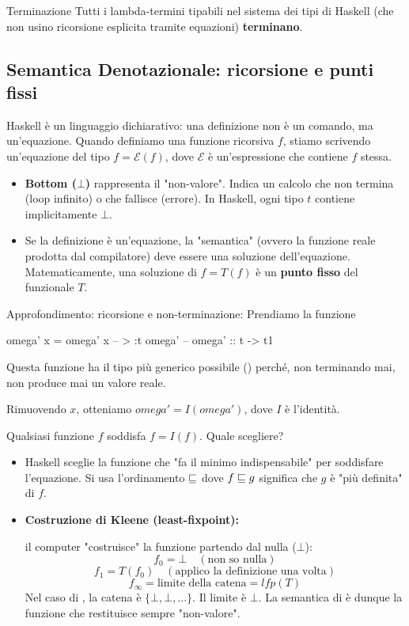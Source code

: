 \begin{lemmaframe}{Terminazione}{}
    Tutti i lambda-termini tipabili nel sistema dei tipi di Haskell (che non usino ricorsione esplicita tramite equazioni) \textbf{terminano}.
\end{lemmaframe}
 

\subsection{Semantica Denotazionale: ricorsione e punti fissi}

Haskell è un linguaggio dichiarativo: una definizione non è un comando, ma un'equazione. 
Quando definiamo una funzione ricorsiva $f$, stiamo scrivendo un'equazione del tipo $f = \mathcal{E}(f)$, dove $\mathcal{E}$ è un'espressione che contiene $f$ stessa.

\begin{itemize}
    \item \textbf{Bottom ($\bot$)} rappresenta il "non-valore". Indica un calcolo che non termina (loop infinito) o che fallisce (errore). In Haskell, ogni tipo $t$ contiene implicitamente $\bot$.
    \item Se la definizione è un'equazione, la "semantica" (ovvero la funzione reale prodotta dal compilatore) deve essere una soluzione dell'equazione. Matematicamente, una soluzione di $f = T(f)$ è un \textbf{punto fisso} del funzionale $T$.
\end{itemize}

\begin{gframe}{Approfondimento: ricorsione e non-terminazione: }
Prendiamo la funzione
\begin{haskellbox}{}
omega' x = omega' x
-- > :t omega'
-- omega' :: t -> t1
\end{haskellbox}
Questa funzione ha il tipo più generico possibile () perché, non terminando mai, non produce mai un valore reale.

Rimuovendo $x$, otteniamo $omega' = I(omega')$, dove $I$ è l'identità.

Qualsiasi funzione $f$ soddisfa $f = I(f)$. Quale scegliere?

\begin{itemize}
    \item Haskell sceglie la funzione che "fa il minimo indispensabile" per soddisfare l'equazione. Si usa l'ordinamento $\sqsubseteq$ dove $f \sqsubseteq g$ significa che $g$ è "più definita" di $f$.
    \item \textbf{Costruzione di Kleene (least-fixpoint):} 

        il computer "costruisce" la funzione partendo dal nulla ($\bot$):
    \[ f_0 = \bot \quad (\text{non so nulla}) \]
    \[ f_1 = T(f_0) \quad (\text{applico la definizione una volta}) \]
    \[ f_{\infty} = \text{limite della catena} = \textit{lfp}(T) \]
    Nel caso di , la catena è $\{\bot, \bot, \dots\}$. Il limite è $\bot$. La semantica di  è dunque la funzione che restituisce sempre "non-valore".
\end{itemize}

\end{gframe}


